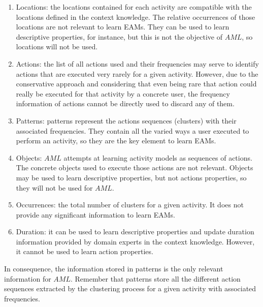 \begin{enumerate}
 \item Locations: the locations contained for each activity are compatible with the locations defined in the context knowledge. The relative occurrences of those locations are not relevant to learn EAMs. They can be used to learn descriptive properties, for instance, but this is not the objective of $AML$, so locations will not be used.
 \item Actions: the list of all actions used and their frequencies may serve to identify actions that are executed very rarely for a given activity. However, due to the conservative approach and considering that even being rare that action could really be executed for that activity by a concrete user, the frequency information of actions cannot be directly used to discard any of them.
 \item Patterns: patterns represent the actions sequences (clusters) with their associated frequencies. They contain all the varied ways a user executed to perform an activity, so they are the key element to learn EAMs.
 \item Objects: $AML$ attempts at learning activity models as sequences of actions. The concrete objects used to execute those actions are not relevant. Objects may be used to learn descriptive properties, but not actions properties, so they will not be used for $AML$.
 \item Occurrences: the total number of clusters for a given activity. It does not provide any significant information to learn EAMs.
 \item Duration: it can be used to learn descriptive properties and update duration information provided by domain experts in the context knowledge. However, it cannot be used to learn action properties.
\end{enumerate}

In consequence, the information stored in patterns is the only relevant information for $AML$. Remember that patterns store all the different action sequences extracted by the clustering process for a given activity with associated frequencies. 

